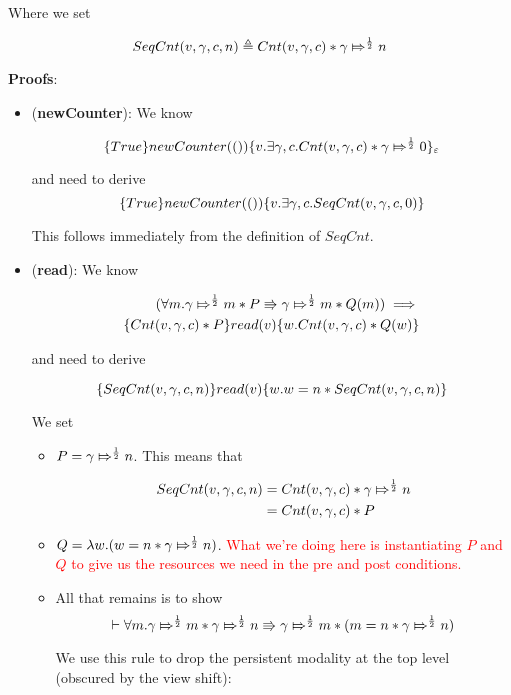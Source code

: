 Where we set

\[
\SCnt{v}{\gamma}{c}{n} \triangleq \Cnt{v}{\gamma}{c} * \apointsto{\gamma}{n}{\frac{1}{2}}
\]

\textbf{Proofs}:
\begin{itemize}
\item (\textbf{newCounter}):  We know

\[
\hot{True}{ newCounter(())}{v. \exists \gamma, c. \Cnt{v}{\gamma}{c} * \apointsto{\gamma}{0}{\frac{1}{2}}}_{\varepsilon}
\]

and need to derive
\[
\hot{True}{ newCounter(())}{v. \exists \gamma, c. \SCnt{v}{\gamma}{c}{0}}
\]

This follows immediately from the definition of $SeqCnt$.

\item (\textbf{read}): We know

\begin{align*}
(\forall m. \apointsto{\gamma}{m}{\frac{1}{2}} * P \Rrightarrow \apointsto{\gamma}{m}{\frac{1}{2}} * Q(m) ) \implies\\
 \hot{\Cnt{v}{\gamma}{c} * P}{read(v)}{w. \Cnt{v}{\gamma}{c} * Q(w)}
\end{align*}

and need to derive

\[
\hot{\SCnt{v}{\gamma}{c}{n}}{read(v)}{w. w = n * \SCnt{v}{\gamma}{c}{n}}
\]

We set
\begin{itemize}
\item $P = \apointsto{\gamma}{n}{\frac{1}{2}}$. This means that

\begin{align*}
\SCnt{v}{\gamma}{c}{n} &= \Cnt{v}{\gamma}{c} * \apointsto{\gamma}{n}{\frac{1}{2}}\\
& = \Cnt{v}{\gamma}{c}  * P
\end{align*}

\item $Q = \lambda w. (w = n * \apointsto{\gamma}{n}{\frac{1}{2}})$. \textcolor{red}{What we're doing here is instantiating $P$ and $Q$ to give us the resources we need in the pre and post conditions.}

\item All that remains is to show
\[
\vdash \forall m. \apointsto{\gamma}{m}{\frac{1}{2}} * \apointsto{\gamma}{n}{\frac{1}{2}} \Rrightarrow \apointsto{\gamma}{m}{\frac{1}{2}} * (m = n * \apointsto{\gamma}{n}{\frac{1}{2}})
\]

We use this rule to drop the persistent modality at the top level (obscured by the view shift):


\end{itemize}
\end{itemize}
